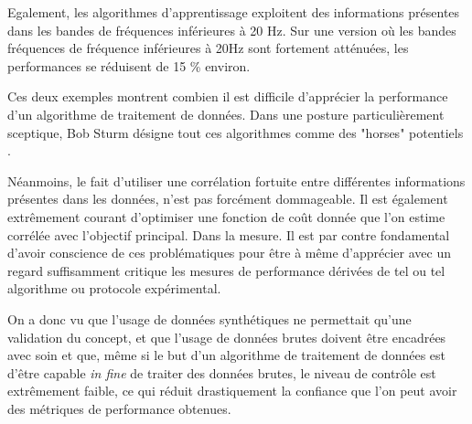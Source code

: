 Egalement, les algorithmes d'apprentissage exploitent des informations présentes dans les bandes de fréquences inférieures à 20 Hz. Sur une version où les bandes fréquences de fréquence inférieures à 20Hz sont fortement atténuées, les performances se réduisent de 15 \% environ.

Ces deux exemples montrent combien il est difficile d'apprécier la performance d'un algorithme de traitement de données. Dans une posture particulièrement sceptique, Bob Sturm désigne tout ces algorithmes comme des "horses" potentiels .

Néanmoins, le fait d'utiliser une corrélation fortuite entre différentes informations présentes dans les données, n'est pas forcément dommageable\cite{lagrange:hal-01635373}. Il est également extrêmement courant d'optimiser une fonction de coût donnée que l'on estime corrélée avec l'objectif principal. Dans la mesure. Il est par contre fondamental d'avoir conscience de ces problématiques pour être à même d'apprécier avec un regard suffisamment critique les mesures de performance dérivées de tel ou tel algorithme ou protocole expérimental.

On a donc vu que l'usage de données synthétiques ne permettait qu'une validation du concept, et que l'usage de données brutes doivent être encadrées avec soin et que, même si le but d'un algorithme de traitement de données est d'être capable \textit{in fine} de traiter des données brutes, le niveau de contrôle est extrêmement faible, ce qui réduit drastiquement la confiance que l'on peut avoir des métriques de performance obtenues.

